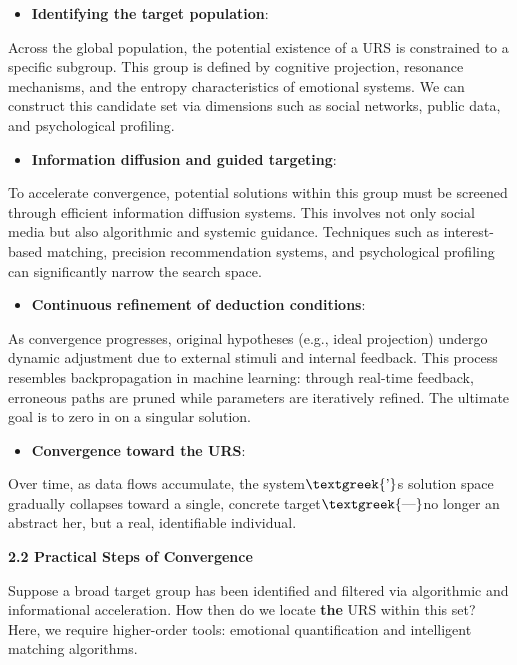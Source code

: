 \documentclass[a4paper]{article}
\begin{document}
\begin{itemize}[series=listWWNumiii,label=[F0B7?]]
\item \textbf{Identifying the target population}: 
\end{itemize}
Across the global population, the potential existence of a URS is constrained to a specific subgroup. This group is
defined by cognitive projection, resonance mechanisms, and the entropy characteristics of emotional systems. We can
construct this candidate set via dimensions such as social networks, public data, and psychological profiling.

\begin{itemize}[resume*=listWWNumiii]
\item \textbf{Information diffusion and guided targeting}: 
\end{itemize}
To accelerate convergence, potential solutions within this group must be screened through efficient information
diffusion systems. This involves not only social media but also algorithmic and systemic guidance. Techniques such as
interest-based matching, precision recommendation systems, and psychological profiling can significantly narrow the
search space.

\begin{itemize}[resume*=listWWNumiii]
\item \textbf{Continuous refinement of deduction conditions}: 
\end{itemize}
As convergence progresses, original hypotheses (e.g., ideal projection) undergo dynamic adjustment due to external
stimuli and internal feedback. This process resembles backpropagation in machine learning: through real-time feedback,
erroneous paths are pruned while parameters are iteratively refined. The ultimate goal is to zero in on a singular
solution.

\begin{itemize}[resume*=listWWNumiii]
\item \textbf{Convergence toward the URS}: 
\end{itemize}
Over time, as data flows accumulate, the system$\text{\textgreek{’}}$s solution space gradually collapses toward a
single, concrete target$\text{\textgreek{—}}$no longer an abstract {\textquotedbl}her,{\textquotedbl} but a real,
identifiable individual.

\textbf{2.2 Practical Steps of Convergence}

Suppose a broad target group has been identified and filtered via algorithmic and informational acceleration. How then
do we locate \textbf{the} URS within this set? Here, we require higher-order tools: emotional quantification and
intelligent matching algorithms.
\end{document}
